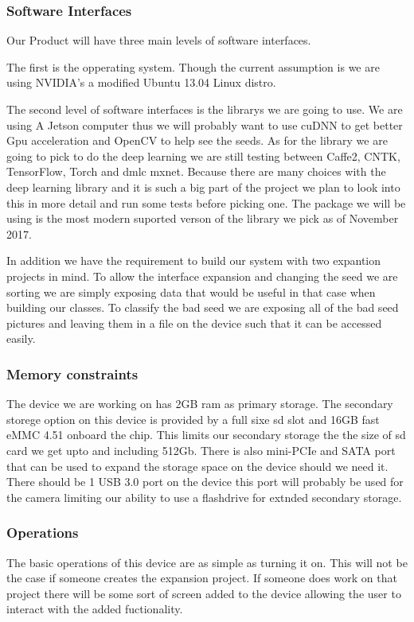 \documentclass[onecolumn, draftclsnofoot,10pt, compsoc]{IEEEtran}
\begin{document}
\subsubsection{Software Interfaces}
Our Product will have three main levels of software interfaces.

The first is the opperating system.
Though the current assumption is we are using NVIDIA's a modified Ubuntu 13.04 Linux distro.

The second level of software interfaces is the librarys we are going to use.
We are using A Jetson computer thus we will probably want to use cuDNN to get better Gpu acceleration and OpenCV to help see the seeds.
As for the library we are going to pick to do the deep learning we are still testing between Caffe2, CNTK, TensorFlow, Torch and dmlc mxnet.
Because there are many choices with the deep learning library and it is such a big part of the project we plan to look into this in more detail and run some tests before picking one.
The package we will be using is the most modern suported verson of the library we pick as of November 2017.

In addition we have the requirement to build our system with two expantion projects in mind.
To allow the interface expansion and changing the seed we are sorting we are simply exposing data that would be useful in that case when building our classes.
To classify the bad seed we are exposing all of the bad seed pictures and leaving them in a file on the device such that it can be accessed easily.

\subsubsection{Memory constraints}
The device we are working on has 2GB ram as primary storage.
The secondary storege option on this device is provided by a full sixe sd slot and 16GB fast eMMC 4.51 onboard the chip.
This limits our secondary storage the the size of sd card we get upto and including 512Gb.
There is also mini-PCIe and SATA port that can be used to expand the storage space on the device should we need it.
There should be 1 USB 3.0 port on the device this port will probably be used for the camera limiting our ability to use a flashdrive for extnded secondary storage.

\subsubsection{Operations}
The basic operations of this device are as simple as turning it on.
This will not be the case if someone creates the expansion project.
If someone does work on that project there will be some sort of screen added to the device allowing the user to interact with the added fuctionality.
\end{document}
